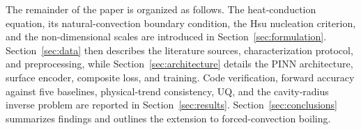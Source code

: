 The remainder of the paper is organized as follows.
The heat-conduction equation, its natural-convection boundary
condition, the Hsu nucleation criterion, and the non-dimensional scales
are introduced in Section~\ref{sec:formulation}.
Section~\ref{sec:data} then describes the literature sources,
characterization protocol, and preprocessing, while
Section~\ref{sec:architecture} details the PINN architecture, surface
encoder, composite loss, and training. Code verification, forward
accuracy against five baselines, physical-trend consistency, UQ, and
the cavity-radius inverse problem are reported in
Section~\ref{sec:results}. Section~\ref{sec:conclusions} summarizes
findings and outlines the extension to forced-convection boiling.
